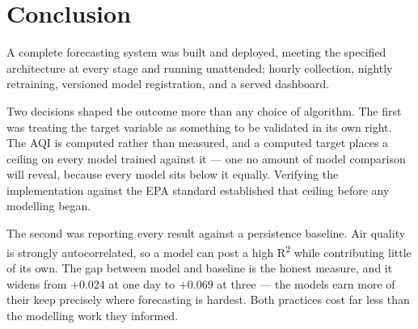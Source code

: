 \documentclass[11pt,a4paper]{article}
\begin{document}
\enlargethispage{6\baselineskip}
\section{Conclusion}

A complete forecasting system was built and deployed, meeting the
specified architecture at every stage and running unattended: hourly
collection, nightly retraining, versioned model registration, and a
served dashboard.

Two decisions shaped the outcome more than any choice of algorithm. The
first was treating the target variable as something to be validated in
its own right. The AQI is computed rather than measured, and a computed
target places a ceiling on every model trained against it --- one no
amount of model comparison will reveal, because every model sits below
it equally. Verifying the implementation against the EPA standard
established that ceiling before any modelling began.

The second was reporting every result against a persistence baseline.
Air quality is strongly autocorrelated, so a model can post a high
R\textsuperscript{2} while contributing little of its own. The gap
between model and baseline is the honest measure, and it widens from
$+0.024$ at one day to $+0.069$ at three --- the models earn more of
their keep precisely where forecasting is hardest. Both practices cost
far less than the modelling work they informed.
\end{document}
